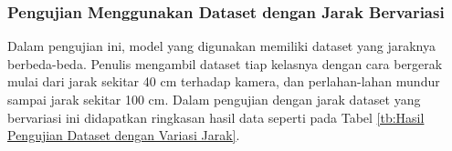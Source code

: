 




\subsubsection{Pengujian Menggunakan Dataset dengan Jarak Bervariasi}
\label{subsubsec:Pengujian Menggunakan Dataset dengan Jarak Bervariasi}
Dalam pengujian ini, model yang digunakan memiliki dataset yang jaraknya berbeda-beda. Penulis mengambil dataset tiap kelasnya dengan cara bergerak mulai dari jarak sekitar 40 cm terhadap kamera, dan perlahan-lahan mundur sampai jarak sekitar 100 cm. Dalam pengujian dengan jarak dataset yang bervariasi ini didapatkan ringkasan hasil data seperti pada Tabel \ref{tb:Hasil Pengujian Dataset dengan Variasi Jarak}. 

